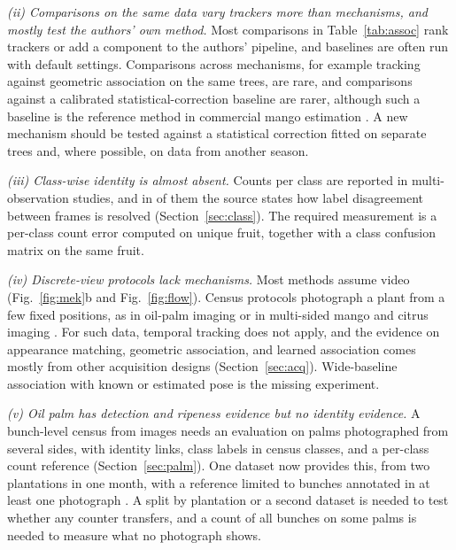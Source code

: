 \textit{(ii) Comparisons on the same data vary trackers more than mechanisms, and mostly test the authors' own method.} Most comparisons in Table~\ref{tab:assoc} rank trackers or add a component to the authors' pipeline, and baselines are often run with default settings. Comparisons across mechanisms, for example tracking against geometric association on the same trees, are rare, and comparisons against a calibrated statistical-correction baseline are rarer, although such a baseline is the reference method in commercial mango estimation \citep{koirala2021attempting}. A new mechanism should be tested against a statistical correction fitted on separate trees and, where possible, on data from another season.

\textit{(iii) Class-wise identity is almost absent.} Counts per class are reported in \nPerClass multi-observation studies, and in \nClassVote of them the source states how label disagreement between frames is resolved (Section~\ref{sec:class}). The required measurement is a per-class count error computed on unique fruit, together with a class confusion matrix on the same fruit.

\textit{(iv) Discrete-view protocols lack mechanisms.} Most methods assume video (Fig.~\ref{fig:mek}b and Fig.~\ref{fig:flow}). Census protocols photograph a plant from a few fixed positions, as in oil-palm imaging \citep{indriani2026sawitmvc} or in multi-sided mango and citrus imaging \citep{nenavath2024tree,zhu2024citrus}. For such data, temporal tracking does not apply, and the evidence on appearance matching, geometric association, and learned association comes mostly from other acquisition designs (Section~\ref{sec:acq}). Wide-baseline association with known or estimated pose is the missing experiment.

\textit{(v) Oil palm has detection and ripeness evidence but no identity evidence.} A bunch-level census from images needs an evaluation on palms photographed from several sides, with identity links, class labels in census classes, and a per-class count reference (Section~\ref{sec:palm}). One dataset now provides this, from two plantations in one month, with a reference limited to bunches annotated in at least one photograph \citep{indriani2026sawitmvc}. A split by plantation or a second dataset is needed to test whether any counter transfers, and a count of all bunches on some palms is needed to measure what no photograph shows.

